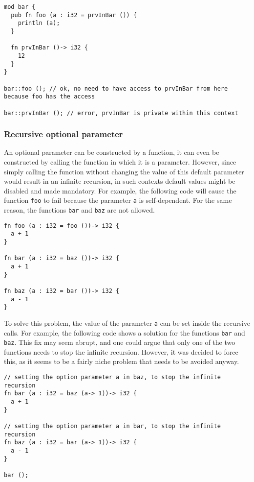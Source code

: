 \begin{lstlisting}[style=coloredverbatim]
mod bar {
  pub fn foo (a : i32 = prvInBar ()) {
    println (a);
  }

  fn prvInBar ()-> i32 {
    12
  }
}

bar::foo (); // ok, no need to have access to prvInBar from here because foo has the access

bar::prvInBar (); // error, prvInBar is private within this context
\end{lstlisting}

\subsubsection{Recursive optional parameter}

An optional parameter can be constructed by a function, it can even be
constructed by calling the function in which it is a parameter. However, since
simply calling the function without changing the value of this default parameter
would result in an infinite recursion, in such contexts default values might be
disabled and made mandatory. For example, the following code will cause the
function \texttt{foo} to fail because the parameter \texttt{a} is
self-dependent. For the same reason, the functions \texttt{bar} and \texttt{baz}
are not allowed.

\begin{lstlisting}[style=coloredverbatim]
fn foo (a : i32 = foo ())-> i32 {
  a + 1
}

fn bar (a : i32 = baz ())-> i32 {
  a + 1
}

fn baz (a : i32 = bar ())-> i32 {
  a - 1
}
\end{lstlisting}

To solve this problem, the value of the parameter \texttt{a} can be set inside
the recursive calls. For example, the following code shows a solution for the
functions \texttt{bar} and \texttt{baz}. This fix may seem abrupt, and one could
argue that only one of the two functions needs to stop the infinite recursion.
However, it was decided to force this, as it seems to be a fairly niche problem
that needs to be avoided anyway.

\begin{lstlisting}[style=coloredverbatim]
// setting the option parameter a in baz, to stop the infinite recursion
fn bar (a : i32 = baz (a-> 1))-> i32 {
  a + 1
}

// setting the option parameter a in bar, to stop the infinite recursion
fn baz (a : i32 = bar (a-> 1))-> i32 {
  a - 1
}

bar ();
\end{lstlisting}

